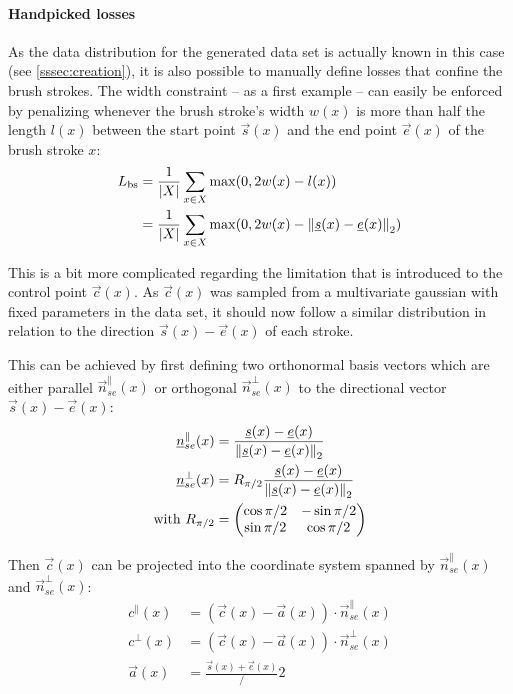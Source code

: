 \paragraph{Handpicked losses} As the data distribution for the generated data set
is actually known in this case (see \ref{sssec:creation}), it is also possible to
manually define losses that confine the brush strokes.
The width constraint -- as a first example -- can easily be enforced by penalizing
whenever the brush stroke's width $w(x)$ is more than half the length $l(x)$ between the
start point $\vec{s}(x)$ and the end point $\vec{e}(x)$ of the brush stroke $x$:
\begin{align}
    L_{\text{bs}} & = \frac{1}{\vert X \vert}\sum_{x \in X} \max(0, 2w(x) - l(x)) \\
    & = \frac{1}{\vert X \vert}\sum_{x \in X} \max(0, 2w(x) - \left\lVert\underline s(x) - \underline e(x)\right\rVert_2)
\end{align}

This is a bit more complicated regarding the limitation that is introduced to the
control point $\vec{c}(x)$.
As $\vec{c}(x)$ was sampled from a multivariate gaussian with fixed parameters in
the data set, it should now follow a similar distribution in relation to the direction
$\vec{s}(x) - \vec{e}(x)$ of each stroke.

This can be achieved by first defining two orthonormal basis vectors which are either
parallel $\vec{n}_{se}^\parallel(x)$ or orthogonal $\vec{n}_{se}^\bot(x)$ to the directional
vector $\vec{s}(x) - \vec{e}(x)$:
\begin{align}
    \underline n_{se}^\parallel(x) & = \frac{\underline s(x) - \underline e(x)}{\left\lVert\underline s(x) - \underline e(x)\right\rVert_2} \\
    \underline n_{se}^\bot(x) & = R_{\pi/2} \frac{\underline s(x) - \underline e(x)}{\left\lVert\underline s(x) - \underline e(x)\right\rVert_2} \\
    \text{with } R_{\pi/2} & =
    \begin{pmatrix}
        \cos \pi/2 & -\sin \pi/2 \\
        \sin \pi/2 & \cos \pi/2
    \end{pmatrix}
\end{align}

Then $\vec{c}(x)$ can be projected into the coordinate system spanned by  $\vec{n}_{se}^\parallel(x)$
and $\vec{n}_{se}^\bot(x)$:
\begin{align}
    c^\parallel(x) & = (\vec{c}(x) - \vec{a}(x)) \cdot \vec{n}_{se}^\parallel(x)  \\
    c^\bot(x) & = (\vec{c}(x) - \vec{a}(x)) \cdot \vec{n}_{se}^\bot(x)  \\
    \vec{a}(x) & = \frac{\vec{s}(x) + \vec{e}(x)}/2
\end{align}

